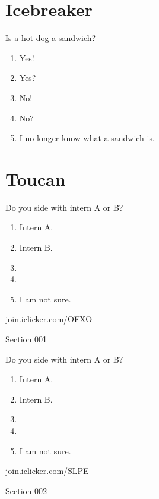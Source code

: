 \documentclass[aspectratio=169, t, 14pt]{beamer}
\begin{document}
\section{Icebreaker}

\begin{frame}
  Is a hot dog a sandwich?
  
  \medskip
  \begin{enumerate} 
    \item Yes!
    \item Yes?
    \item No!
    \item No?
    \item I no longer know what a sandwich is.
  \end{enumerate} 
\end{frame}

\section{Toucan}

\begin{poll}
  Do you side with intern A or B?

  \begin{minipage}{3in}
    \begin{enumerate}
      \item Intern A.
      \item Intern B.
      \item 
      \item 
      \item I am not sure.
    \end{enumerate}
  \end{minipage}
\begin{minipage}{2in}
    \centering
    \bigskip

    \footnotesize\url{join.iclicker.com/OFXO} 

    \bigskip
    Section 001
  \end{minipage}
\end{poll}

\begin{poll}
  Do you side with intern A or B?

  \begin{minipage}{3in}
    \begin{enumerate}
      \item Intern A.
      \item Intern B.
      \item 
      \item 
      \item I am not sure.
    \end{enumerate}
  \end{minipage}
\begin{minipage}{2in}
    \centering
    \bigskip

    \footnotesize\url{join.iclicker.com/SLPE} 

    \bigskip
    Section 002
  \end{minipage}
\end{poll}
\end{document}
